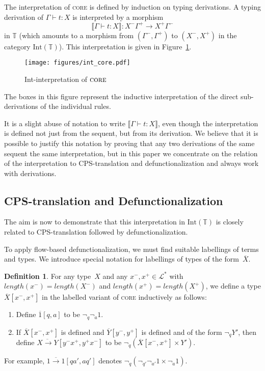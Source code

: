 \documentclass{LMCS}
\theoremstyle{definition}
\newtheorem{definition}[thm]{Definition}
\theoremstyle{plain}
\newcommand{\lollipop}{\to}
\newcommand{\length}[1]{\mathit{length}(#1)}
\newcommand{\SeqTm}[3]{#1 \vdash #2 \colon #3}
\newcommand{\LL}{\mathcal{L}}
\newcommand{\TT}{\mathbb{T}}
\newcommand{\Int}[1]{\textrm{Int}(#1)}
\newcommand{\sem}[1]{\llbracket #1 \rrbracket}
\begin{document}
The interpretation of \textsc{core} is defined by induction on typing derivations.
A typing derivation of $\SeqTm{\Gamma}{t}{X}$ is interpreted by  
a morphism 
\[
  \sem{\SeqTm{\Gamma}{t}{X}}\colon X^-\Gamma^+ \to X^+\Gamma^-
\]
in $\TT$ (which amounts to a morphism from $(\Gamma^-,\Gamma^+)$ to 
$(X^-,X^+)$ in the category $\Int\TT$).
This interpretation is given in Figure~\ref{fig:intcore}.
\begin{figure}
\begin{center}
  \texttt{[image: figures/int\_core.pdf]}
\end{center}
\caption{Int-interpretation of $\textsc{core}$}
\label{fig:intcore}
\end{figure}
The boxes in this figure represent the inductive interpretation of the direct
sub-derivations of the individual rules.

It is a slight abuse of notation to write 
$\sem{\SeqTm{\Gamma}{t}{X}}$, even though the interpretation 
is defined not just from the sequent, but from its derivation.
We believe that it is possible to justify this notation by
proving that any two derivations
of the same sequent the same interpretation,
but in this paper we concentrate on the relation of
the interpretation to CPS-translation and defunctionalization
and always work with derivations.

\subsection{CPS-translation and Defunctionalization}

The aim is now to demonstrate that this interpretation in $\Int\TT$
is closely related to 
CPS-translation followed by defunctionalization.

To apply flow-based defunctionalization, we must find suitable labellings
of terms and types. We introduce special notation for labellings of types
of the form~$\overline X$.

\begin{definition}
For any type~$X$ and any $x^-,x^+\in \LL^*$ with
$\length{x^-} = \length{X^-}$
and
$\length{x^+} = \length{X^+}$,
we define a type $\overline X[x^-,x^+]$ in the 
labelled variant of \textsc{core} inductively as follows:
\begin{enumerate}
  \item Define $\overline{1}[q, a]$ to be $\neg_q \neg_a 1$.
  \item 
    If $\overline{X}[x^-,x^+]$ is defined and
    $\overline Y[y^-, y^+]$ is defined and of the form $\neg_{q} Y'$,
    then define $\overline{X\lollipop Y}[y^- x^+, y^+ x^-]$
    to be $\neg_{q}(\overline X[x^-, x^+] \times Y')$.
\end{enumerate}
\end{definition}
\noindent
For example, $\overline{1\lollipop 1}[qa',aq']$ denotes
$\neg_q(\neg_{q'}\neg_{a'}1 \times \neg_a 1)$.
\end{document}

